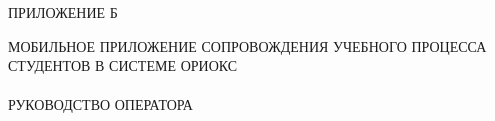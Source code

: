 \begin{flushright}
  ПРИЛОЖЕНИЕ Б
\end{flushright}
\vfill
\begin{center}
  \uppercase{Мобильное приложение сопровождения учебного процесса студентов в системе ОРИОКС\\~\\
  Руководство оператора}
\end{center}
\vfill

\setcounter{page}{1}
\thispagestyle{empty}
